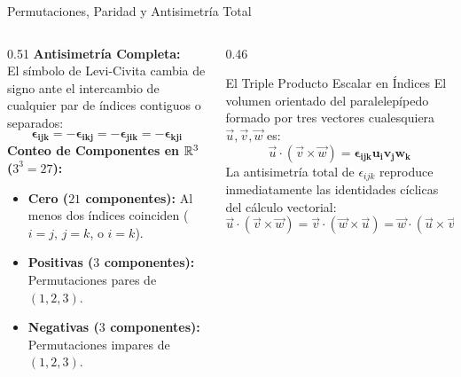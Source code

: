 \documentclass[10pt,aspectratio=169]{beamer}
\begin{document}
\begin{frame}{Permutaciones, Paridad y Antisimetría Total}
  \begin{columns}[c]
    \begin{column}{0.51\textwidth}
      \footnotesize
      \textbf{Antisimetría Completa:}\\[2pt]
      El símbolo de Levi-Civita cambia de signo ante el intercambio de cualquier par de índices contiguos o separados:
      \[
      \mathbf{\epsilon_{ijk} = -\epsilon_{ikj} = -\epsilon_{jik} = -\epsilon_{kji}}
      \]
      \textbf{Conteo de Componentes en $\mathbb{R}^3$ ($3^3 = 27$):}
      \begin{itemize}
        \itemsep2pt
        \item \textbf{Cero ($21$ componentes):} Al menos dos índices coinciden ($i=j$, $j=k$, o $i=k$).
        \item \textbf{Positivas ($3$ componentes):} Permutaciones pares de $(1,2,3)$.
        \item \textbf{Negativas ($3$ componentes):} Permutaciones impares de $(1,2,3)$.
      \end{itemize}
    \end{column}
    \begin{column}{0.46\textwidth}
      \begin{block}{El Triple Producto Escalar en Índices}
        \footnotesize
        El volumen orientado del paralelepípedo formado por tres vectores cualesquiera $\vec{u}, \vec{v}, \vec{w}$ es:
        \[
        \vec{u}\cdot(\vec{v}\times\vec{w}) = \mathbf{\epsilon_{ijk} u_i v_j w_k}
        \]
        La antisimetría total de $\epsilon_{ijk}$ reproduce inmediatamente las identidades cíclicas del cálculo vectorial:
        \[
        \vec{u}\cdot(\vec{v}\times\vec{w}) = \vec{v}\cdot(\vec{w}\times\vec{u}) = \vec{w}\cdot(\vec{u}\times\vec{v})
        \]
      \end{block}
    \end{column}
  \end{columns}
\end{frame}
\end{document}
